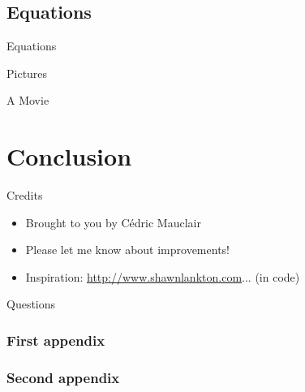 \subsection{Equations}

\begin{frame}
  {Equations}

  \begin{itemize}

  \end{itemize}
\end{frame}


\begin{frame}
  {Pictures}

\end{frame}


\begin{frame}
  {A Movie}


\end{frame}


\section
  {Conclusion}

\begin{bibunit}[plain]
\begin{frame}
  {Credits}

  \begin{itemize}
  \item Brought to you by Cédric Mauclair
  \item Please let me know about improvements!
  \item Inspiration: \url{http://www.shawnlankton.com}... (in code)
  \end{itemize}

  \nocite{ipsum}
  

\end{frame}
\end{bibunit}

\begin{bibunit}[plain]
\begin{frame}
  {Questions}

  \nocite{lorem}
  

\end{frame}
\end{bibunit}


\appendix[Appendices]

\begin{frame}
  \frametitle{First appendix}
\end{frame}

\begin{frame}
  \frametitle{Second appendix}
\end{frame}




